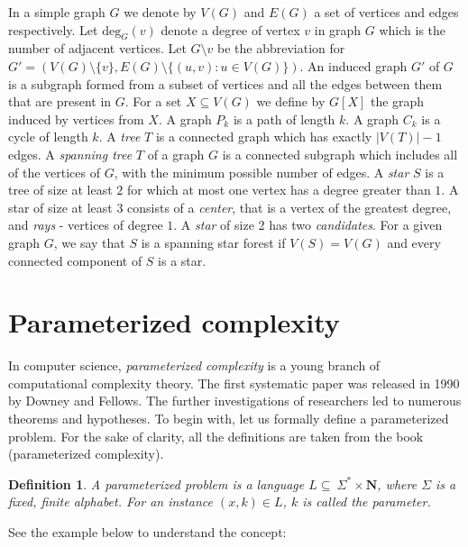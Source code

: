 \documentclass[en]{pracamgr}
\newtheorem{definition}{Definition}
\newcommand{\ssf}{spanning star forest}
\newcommand{\degree}[2]{\textrm{deg}_{#1}(#2)}
\begin{document}
In a simple graph $G$ we denote by $V(G)$ and $E(G)$ a set of vertices and edges respectively. 
Let $\degree{G}{v}$ denote a degree of vertex $v$ in graph $G$ which is the number of adjacent vertices. 
Let $G \setminus v$ be the abbreviation for $G'=(V(G) \setminus \{v\}, E(G) \setminus \{(u,v): u \in V(G)\})$. 
An induced graph $G'$ of $G$ is a subgraph formed from a subset of vertices and all the edges between them that are present in $G$. For a set $X \subseteq V(G)$ we define by $G[X]$ the graph induced by vertices from $X$. 
A graph $P_k$ is a path of length $k$. A graph $C_k$ is a cycle of length $k$. 
A \emph{tree} $T$ is a connected graph which has exactly $|V(T)|-1$ edges. 
A \emph{spanning tree} $T$ of a graph $G$ is a connected subgraph which includes all of the vertices of $G$, with the minimum possible number of edges.
A \emph{star} $S$ is a tree of size at least $2$ for which at most one vertex has a degree greater than $1$. 
A star of size at least $3$ consists of a \emph{center}, that is a vertex of the greatest degree, and \emph{rays} - vertices of degree $1$. 
A \emph{star} of size 2 has two \emph{candidates}.
For a given graph $G$, we say that $S$ is a \ssf{} if $V(S)=V(G)$ and every connected component of $S$ is a star. 

\section{Parameterized complexity}

In computer science, \emph{parameterized complexity} is a young branch of computational complexity theory. The first systematic paper was released in 1990 by Downey and Fellows. The further investigations of researchers led to numerous theorems and hypotheses. To begin with, let us formally define a parameterized problem. For the sake of clarity, all the definitions are taken from the book (parameterized complexity).


\begin{definition}\label{Parameterized problem}
	A {\textup{parameterized problem}} is a language $L \subseteq \ \Sigma^* \times \mathbf{N}$, where $\Sigma$ is a fixed, finite alphabet. For an instance $(x,k) \in L$, $k$ is called the \textup{parameter}.
\end{definition}

See the example below to understand the concept:
\end{document}
